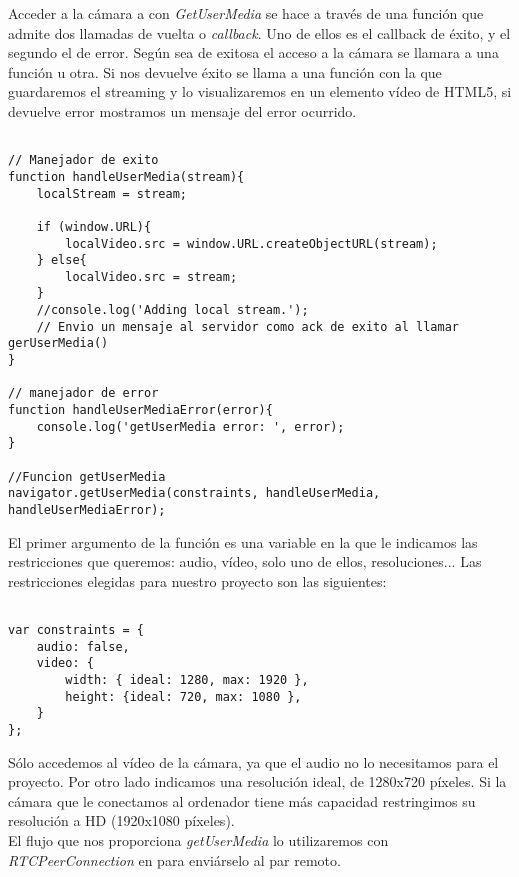 Acceder a la cámara a con \emph{GetUserMedia} se hace a través de una función que admite dos llamadas de vuelta o \emph{callback}. Uno de ellos es el callback de éxito, y el segundo el de error. Según sea de exitosa el acceso a la cámara se llamara a una función u otra. Si nos devuelve éxito se llama a una función con la que guardaremos el streaming y lo visualizaremos en un elemento vídeo de HTML5, si devuelve error mostramos un mensaje del error ocurrido.\\

\begin{lstlisting}[caption=getUserMedia.]

// Manejador de exito
function handleUserMedia(stream){
	localStream = stream;

	if (window.URL){
		localVideo.src = window.URL.createObjectURL(stream);
	} else{
		localVideo.src = stream;
	}
	//console.log('Adding local stream.');
	// Envio un mensaje al servidor como ack de exito al llamar gerUserMedia()	
}

// manejador de error
function handleUserMediaError(error){
	console.log('getUserMedia error: ', error);
}

//Funcion getUserMedia
navigator.getUserMedia(constraints, handleUserMedia, handleUserMediaError); 

\end{lstlisting}

El primer argumento de la función es una variable en la que le indicamos las restricciones que queremos: audio, vídeo, solo uno de ellos, resoluciones... Las restricciones elegidas para nuestro proyecto son las siguientes:\\

\begin{lstlisting}[caption=Restricciones de getUserMedia]

var constraints = {
    audio: false,
    video: {
        width: { ideal: 1280, max: 1920 },
        height: {ideal: 720, max: 1080 },
    }
};

\end{lstlisting}

Sólo accedemos al vídeo de la cámara, ya que el audio no lo necesitamos para el proyecto. Por otro lado indicamos una resolución ideal, de 1280x720 píxeles. Si la cámara que le conectamos al ordenador tiene más capacidad restringimos su resolución a HD (1920x1080 píxeles).\\

El flujo que nos proporciona \emph{getUserMedia} lo utilizaremos con \emph{RTCPeerConnection} en para enviárselo al par remoto.\\

